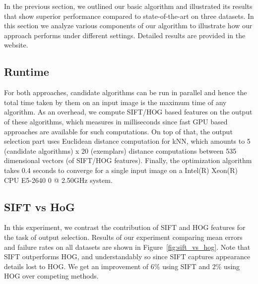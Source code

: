 \label{subsec:experimental_analysis}
In the previous section, we outlined our basic algorithm and illustrated its results that
show superior performance compared to state-of-the-art on three datasets. In this section
we analyze various components of our algorithm to illustrate how 
our approach performs under different settings. Detailed results are provided in the website.

\subsection{Runtime} For both approaches, candidate algorithms can be run in parallel and hence
the total time taken by them on an input image is the maximum time of any algorithm. As an overhead,
we compute SIFT/HOG based features on the output of these algorithms, which measures in milliseconds
since fast GPU based approaches are available for such computations. On top of that, the output selection 
part uses Euclidean distance computation for kNN, which amounts to 5 (candidate algorithms) x 20
(exemplars) distance computations between 535 dimensional vectors (of SIFT/HOG features). 
Finally, the optimization algorithm takes 0.4 seconds to converge for a single input image on a 
Intel(R) Xeon(R) CPU E5-2640 0 @ 2.50GHz system.

\subsection{SIFT vs HoG}
\label{subsec:sift_vs_hog_vs_both}
In this experiment, we contrast the contribution of SIFT
and HOG features for the task of output selection. Results of our experiment comparing mean errors
and failure rates on all datasets are shown in Figure~\ref{fig:sift_vs_hog}. Note that
SIFT outperforms HOG, and understandably so since SIFT captures appearance details lost to HOG. 
We get an improvement of $6\%$ using SIFT and $2\%$ using HOG over competing
methods.

